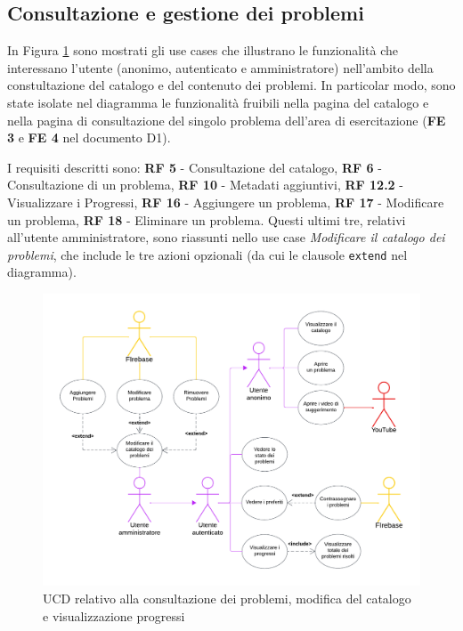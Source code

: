 \documentclass[11pt, a4paper]{article}
\theoremstyle{definition} %
\begin{document}
\newpage
\subsection{Consultazione e gestione dei problemi}\label{consultazione}
In Figura \ref{catalogueprobs} sono mostrati gli use cases che illustrano
le funzionalità che interessano l'utente (anonimo, autenticato e amministratore)
nell'ambito della constultazione del catalogo e del contenuto
dei problemi. In particolar modo, sono state isolate nel diagramma le funzionalità
fruibili nella pagina del catalogo e nella pagina di consultazione
del singolo problema dell'area di esercitazione (\textbf{FE 3} e \textbf{FE 4}
nel documento D1).

I requisiti descritti sono: \textbf{RF 5} - Consultazione del catalogo,
\textbf{RF 6} - Consultazione di un problema, \textbf{RF 10} - Metadati aggiuntivi,
\textbf{RF 12.2} - Visualizzare i Progressi, \textbf{RF 16} - Aggiungere un problema,
\textbf{RF 17} - Modificare un problema, \textbf{RF 18} - Eliminare un problema.
Questi ultimi tre, relativi all'utente amministratore, sono riassunti nello use case
\textit{Modificare il catalogo dei problemi}, che include le tre azioni opzionali (da
cui le clausole \texttt{extend} nel diagramma).


\begin{figure}[H]
\centering
\hspace*{-1.8cm}
\includegraphics[scale=0.76]{materiale/ucdiagrams/ucproblemi.pdf}
\caption{UCD relativo alla consultazione dei problemi, modifica del catalogo e visualizzazione progressi}
\label{catalogueprobs}
\end{figure}
\end{document}
